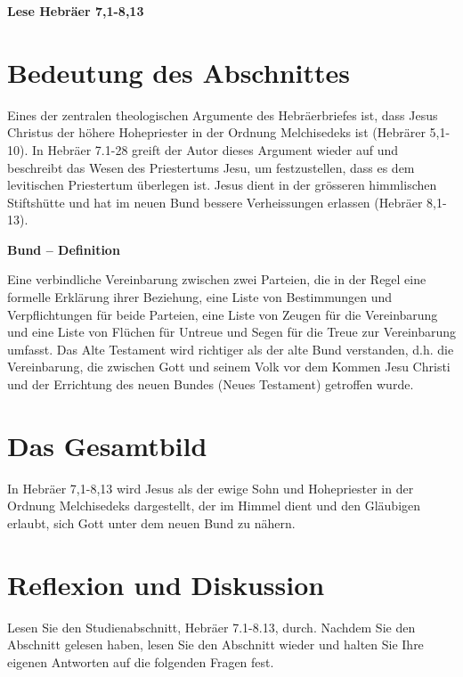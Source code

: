 \documentclass[
  12pt,
]{krantz}
\makeatletter
\newenvironment{kframe}{%
\medskip{}
\setlength{\fboxsep}{.8em}
 \def\at@end@of@kframe{}%
 \ifinner\ifhmode%
  \def\at@end@of@kframe{\end{minipage}}%
  \begin{minipage}{\columnwidth}%
 \fi\fi%
 \def\FrameCommand##1{\hskip\@totalleftmargin \hskip-\fboxsep
 \colorbox{shadecolor}{##1}\hskip-\fboxsep
     \hskip-\linewidth \hskip-\@totalleftmargin \hskip\columnwidth}%
 \MakeFramed {\advance\hsize-\width
   \@totalleftmargin\z@ \linewidth\hsize
   \@setminipage}}%
 {\par\unskip\endMakeFramed%
 \at@end@of@kframe}
\newenvironment{rmdblock}[1]
  {
  \begin{itemize}
  \renewcommand{\labelitemi}{
    \raisebox{-.7\height}[0pt][0pt]{
      {\setkeys{Gin}{width=3em,keepaspectratio}\texttt{[image: img/\#1]}}
    }
  }
  \setlength{\fboxsep}{1em}
  \begin{kframe}
  \item
  }
  {
  \end{kframe}
  \end{itemize}
  }
\newenvironment{rmdbible}
  {\begin{rmdblock}{bible}}
  {\end{rmdblock}}
\newenvironment{rmddefinition}
  {\begin{rmdblock}{definition}}
  {\end{rmdblock}}
\makeatother
\begin{document}
\begin{rmdbible}
\textbf{Lese Hebräer 7,1-8,13}
\end{rmdbible}

\hypertarget{bedeutung-des-abschnittes}{%
\section{Bedeutung des Abschnittes}\label{bedeutung-des-abschnittes}}

Eines der zentralen theologischen Argumente des Hebräerbriefes ist, dass Jesus Christus der höhere Hohepriester in der Ordnung Melchisedeks ist (Hebrärer 5,1-10). In Hebräer 7.1-28 greift der Autor dieses Argument wieder auf und beschreibt das Wesen des Priestertums Jesu, um festzustellen, dass es dem levitischen Priestertum überlegen ist. Jesus dient in der grösseren himmlischen Stiftshütte und hat im neuen Bund bessere Verheissungen erlassen (Hebräer 8,1-13).

\begin{rmddefinition}
\textbf{Bund -- Definition}

Eine verbindliche Vereinbarung zwischen zwei Parteien, die in der Regel
eine formelle Erklärung ihrer Beziehung, eine Liste von Bestimmungen und
Verpflichtungen für beide Parteien, eine Liste von Zeugen für die
Vereinbarung und eine Liste von Flüchen für Untreue und Segen für die
Treue zur Vereinbarung umfasst. Das Alte Testament wird richtiger als
der alte Bund verstanden, d.h. die Vereinbarung, die zwischen Gott und
seinem Volk vor dem Kommen Jesu Christi und der Errichtung des neuen
Bundes (Neues Testament) getroffen wurde.
\end{rmddefinition}

\hypertarget{das-gesamtbild}{%
\section{Das Gesamtbild}\label{das-gesamtbild}}

In Hebräer 7,1-8,13 wird Jesus als der ewige Sohn und Hohepriester in der Ordnung Melchisedeks dargestellt, der im Himmel dient und den Gläubigen erlaubt, sich Gott unter dem neuen Bund zu nähern.

\hypertarget{reflexion-und-diskussion}{%
\section{Reflexion und Diskussion}\label{reflexion-und-diskussion}}

Lesen Sie den Studienabschnitt, Hebräer 7.1-8.13, durch. Nachdem Sie den Abschnitt gelesen haben, lesen Sie den Abschnitt wieder und halten Sie Ihre eigenen Antworten auf die folgenden Fragen fest.
\end{document}
